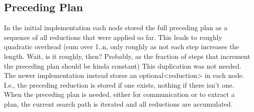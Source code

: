 \subsection{Preceding Plan}
In the initial implementation each node stored the full preceding plan as a sequence of all reductions that were applied so far. This leads to roughly quadratic overhead (sum over 1..n, only roughly as not each step increases the length. Wait, is it roughly, then? Probably, as the fraction of steps that increment the preceding plan should be kinda constant)
This duplication was not needed. The newer implementation instead stores an optional<reduction> in each node. I.e., the preceding reduction is stored if one exists, nothing if there isn't one. When the preceding plan is needed, either for communication or to extract a plan, the current search path is iterated and all reductions are accumulated.

